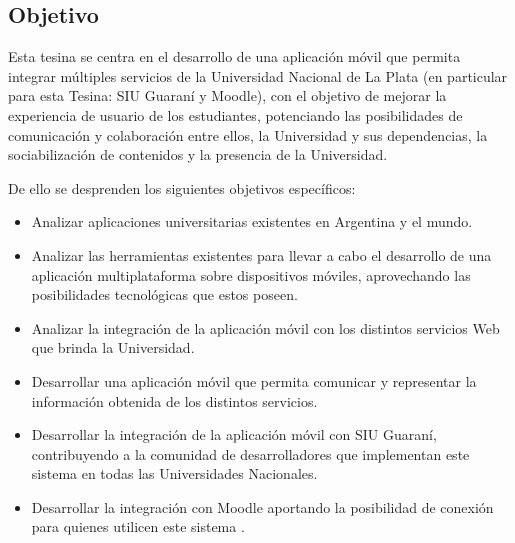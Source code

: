 \subsection{Objetivo}
\label{objetivo}

Esta tesina se centra en el desarrollo de una aplicación móvil que permita
integrar múltiples servicios de la Universidad Nacional de La Plata (en
particular para esta Tesina: SIU Guaraní y Moodle), con el objetivo de mejorar
la experiencia de usuario de los estudiantes, potenciando las posibilidades de
comunicación y colaboración entre ellos, la Universidad y sus dependencias, la
sociabilización de contenidos y la presencia de la Universidad.

De ello se desprenden los siguientes objetivos específicos:

\begin{itemize}
  \item Analizar aplicaciones universitarias existentes en Argentina y el mundo.

  \item Analizar las herramientas existentes para llevar a cabo el desarrollo
  de una aplicación multiplataforma sobre dispositivos móviles, aprovechando las
  posibilidades tecnológicas que estos poseen.

  \item Analizar la integración de la aplicación móvil con los distintos
  servicios Web que brinda la Universidad.

  \item Desarrollar una aplicación móvil que permita comunicar y representar la
  información obtenida de los distintos servicios.

  \item Desarrollar la integración de la aplicación móvil con SIU Guaraní,
  contribuyendo a la comunidad de desarrolladores que implementan este sistema en todas las Universidades Nacionales.

  \item Desarrollar la integración con Moodle aportando la posibilidad de
  conexión para quienes utilicen este sistema .
\end{itemize}
